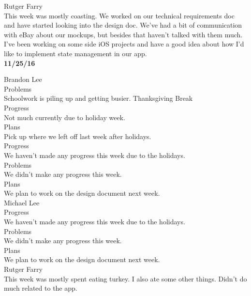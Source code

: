 \documentclass[letterpaper,10pt,titlepage]{article}
\begin{document}
Rutger Farry\\

This week was mostly coasting. We worked on our technical requirements doc and have started looking into the design doc. We've had a bit of communication with eBay about our mockups, but besides that haven't talked with them much. I've been working on some side iOS projects and have a good idea about how I'd like to implement state management in our app.\\

\textbf{11/25/16}

Brandon Lee\\

Problems\\
Schoolwork is piling up and getting busier.
Thanksgiving Break\\

Progress\\
Not much currently due to holiday week.\\

Plans\\
Pick up where we left off last week after holidays.\\

Progress\\
We haven't made any progress this week due to the holidays.\\

Problems\\
We didn't make any progress this week.\\

Plans\\
We plan to work on the design document next week.\\

Michael Lee\\

Progress\\
We haven't made any progress this week due to the holidays.\\

Problems\\
We didn't make any progress this week.\\

Plans\\
We plan to work on the design document next week.\\

Rutger Farry\\

This week was mostly spent eating turkey. I also ate some other things. Didn't do much related to the app.\\
\end{document}
